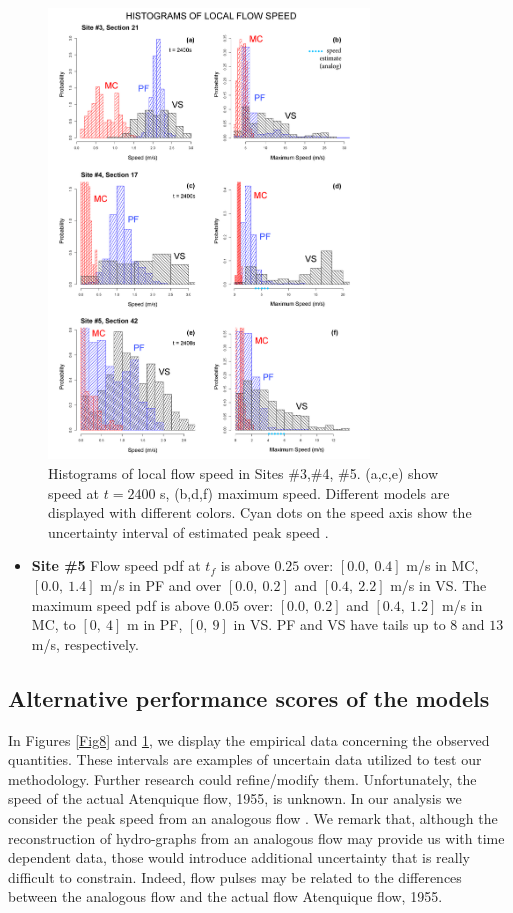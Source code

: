 \documentclass[nhess, manuscript]{copernicus}
\begin{document}
\begin{figure}[H]
\centering
\includegraphics[width=0.76\textwidth]{Fig9.png}
\caption{Histograms of local flow speed in Sites \#3,\#4, \#5. (a,c,e) show speed at $t=2400$ s, (b,d,f) maximum speed. Different models are displayed with different colors. Cyan dots on the speed axis show the uncertainty interval of estimated peak speed \cite{Pierson1985}.}
\label{Fig9}
\end{figure}

\begin{itemize}
\item\textbf{Site \#5} Flow speed pdf at $t_f$ is above $0.25$ over: $[0.0,\ 0.4]$ m/s in MC, $[0.0,\ 1.4]$ m/s in PF and over $[0.0,\ 0.2]$ and $[0.4,\ 2.2]$  m/s in VS. The maximum speed pdf is above $0.05$ over: $[0.0,\ 0.2]$ and $[0.4,\ 1.2]$ m/s in MC, to $[0,\ 4]$ m in PF, $[0,\ 9]$ in VS. PF and VS have tails up to $8$ and $13$ m/s, respectively.
\end{itemize}

\subsection{Alternative performance scores of the models}
In  Figures \ref{Fig8} and \ref{Fig9}, we display the empirical data concerning the observed quantities. These intervals are examples of uncertain data utilized to test our methodology. Further research could refine/modify them. Unfortunately, the speed of the actual Atenquique flow, 1955, is unknown. In our analysis we consider the peak speed from an analogous flow \citep{Pierson1985, Saucedo2008}. We remark that, although the reconstruction of hydro-graphs from an analogous flow may provide us with time dependent data, those would introduce additional uncertainty that is really difficult to constrain. Indeed, flow pulses may be related to the differences between the analogous flow and the actual flow Atenquique flow, 1955.
\end{document}
